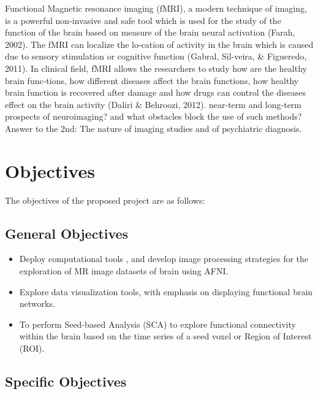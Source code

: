 \documentclass{article}
\begin{document}
\enlargethispage{\baselineskip}
Functional   Magnetic   resonance   imaging   (fMRI), a modern
technique of imaging, is a powerful non-invasive and safe tool which
is used for the study of the function of the brain based on measure of
the brain neural activation (Farah, 2002). The fMRI can localize the
lo-cation  of  activity in the  brain  which  is  caused  due  to
sensory  stimulation  or  cognitive  function (Gabral,  Sil-veira, \&
Figueredo, 2011). In clinical field, fMRI allows the researchers to
study how are the healthy brain func-tions, how different diseases
affect the brain functions, how  healthy  brain  function  is
recovered  after  damage  and  how  drugs  can  control  the  diseases
effect  on  the  brain activity (Daliri \& Behroozi, 2012).  near-term
and long-term prospects of neuroimaging? and what obstacles block the
use of such methods? Answer to the 2nd: The nature of imaging studies
and of psychiatric diagnosis.

\newpage

\section{Objectives}

The objectives of the proposed project are as follows:

\subsection{General Objectives}

\begin{itemize}

  \item Deploy computational tools , and develop image processing
    strategies for the exploration of MR image datasets of brain using
    AFNI.

  \item Explore data visualization tools, with emphasis on displaying
    functional brain networks.

  \item To perform Seed-based Analysis (SCA) to explore functional
    connectivity within the brain based on the time series of a seed
    voxel or Region of Interest (ROI).

\end{itemize}

\subsection{Specific Objectives}
\end{document}
